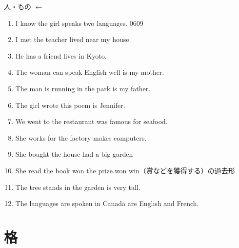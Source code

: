 \documentclass[aspectratio=169,xcolor={dvipsnames,table}]{beamer}
\begin{document}
\begin{frame}[plain,label=ichiran]{人・もの $\leftarrow$ }
 \begin{enumerate}
  \item I know the girl  speaks two languages.%
\hfill{\tiny 0609}\,{\scriptsize {}}
  \item I met the teacher  lived near my house.
  \item He has a friend  lives in Kyoto.
  \item The woman  can speak English well is my mother.
  \item The man  is running in the park is my father.
  \item The girl  wrote this poem is Jennifer.
  \item We went to the restaurant  was famous for seafood.
  \item She works for the factory  makes computers.
  \item She bought the house  had a big garden
  \item She read the book  won the prize.\hfill{\scriptsize won  win（賞などを獲得する）の過去形}
  \item The tree  stands in the garden is very tall.
  \item The languages  are spoken in Canada are English and French.
 \end{enumerate}
\end{frame}
\section{格}
\end{document}
